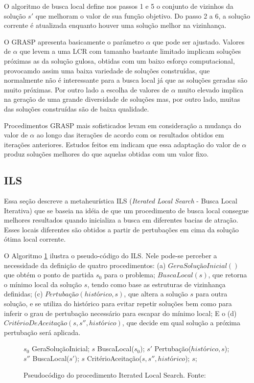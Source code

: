 O algoritmo de busca local define nos passos 1 e 5 o conjunto de vizinhos da
solução $s{'}$ que melhoram o valor de sua função objetivo. Do passo 2 a 6, a
solução corrente é atualizada enquanto houver uma solução melhor na vizinhança.

O GRASP apresenta basicamente o parâmetro $\alpha$ que pode ser ajustado.
Valores de $\alpha$ que levem a uma LCR com tamanho bastante limitado implicam
soluções próximas as da solução gulosa, obtidas com um baixo esforço
computacional, provocamdo assim uma baixa variedade de soluções construídas, que
normalmente não é interessante para a busca local já que as soluções geradas
são muito próximas. Por outro lado a escolha de valores de $\alpha$ muito
elevado implica na geração de uma grande diversidade de soluções mas, por
outro lado, muitas das soluções construídas são de baixa qualidade.

Procedimentos GRASP mais sofisticados levam em consideração a mudança do valor
de $\alpha$ ao longo das iterações de acordo com os resultados obtidos em 
iterações anteriores. Estudos feitos em \cite{prais2000} indicam que essa
adaptação do valor de $\alpha$ produz soluções melhores do que aquelas obtidas
com um valor fixo.

\subsection{ILS}

Essa seção descreve a metaheurística ILS (\textit{Iterated Local Search} -
Busca Local Iterativa) que se baseia na idéia de que um procedimento de busca local
consegue melhores resultados quando inicializa a busca em diferentes bacias de
atração. Esses locais diferentes são obtidos a partir de pertubações em cima da
solução ótima local corrente.

O Algoritmo \ref{alg:ils} ilustra o pseudo-código do ILS. Nele pode-se perceber
a necessidade da definição de quatro procedimentos: (a) $GeraSoluçãoInicial()$
que obtém o ponto de partida $s_{0}$ para o problema; $BuscaLocal(s)$, que
retorna o mínimo local da solução $s$, tendo como base as estruturas de
vizinhança definidas; (c) $Pertubação(histórico, s)$, que altera a solução $s$
para outra solução, e se utiliza do histórico para evitar repetir soluções bem
como para inferir o grau de pertubação necessário para escapar do mínimo local;
E o (d) $CritérioDeAceitação(s, s{''}, histórico)$, que decide em qual solução
a próxima pertubação será aplicada.

\begin{figure}[h]
\caption{Pseudocódigo do procedimento Iterated Local Search. \newline
\mbox{Fonte:
\cite{notasmarcone}}}\label{alg:ils}
\begin{programma}
\STATE $s_{0}$ \GETS GeraSoluçãoInicial;
\STATE $s$ \GETS BuscaLocal($s_{0}$);
\STATE $s{'}$ \GETS Pertubação($histórico, s$);
\STATE $s{''}$ \GETS BuscaLocal($s{'}$);
\STATE $s$ \GETS CritérioAceitação($s, s{''}, histórico$);
\ENDWHILE
\STATE\RETURN $s$;
\ENDALGORITHM
\end{programma}
\end{figure}

